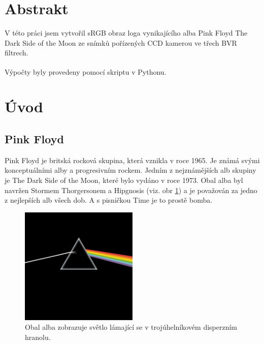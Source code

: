 \documentclass[a4paper,11pt,twocolumn]{article}
\begin{document}

    \vskip10pt
    \section{Abstrakt}
        V této práci jsem vytvořil sRGB obraz loga vynikajícího alba Pink Floyd The Dark Side of the Moon ze snímků pořízených CCD kamerou ve třech BVR filtrech.
        
        Výpočty byly provedeny pomocí skriptu v Pythonu\textsuperscript{\cite{github}}.
    \section{Úvod}
        \subsection{Pink Floyd}
            Pink Floyd je britská rocková skupina, která vznikla v roce 1965. Je známá svými konceptuálními alby a progresivním rockem. Jedním z nejznámějších alb skupiny je The Dark Side of the Moon, které bylo vydáno v roce 1973. Obal alba byl navržen Stormem Thorgersonem a Hipgnosis (viz. obr \ref{fig:pink_floyd}) a je považován za jedno z nejlepších alb všech dob. A s pisničkou Time je to prostě bomba.

            \begin{figure}
                \centering
                \includegraphics[width=0.5\textwidth]{pf}
                \caption{Obal alba zobrazuje světlo lámající se v trojúhelníkovém disperzním hranolu.}
                \label{fig:pink_floyd}
            \end{figure}
        
\end{document}
